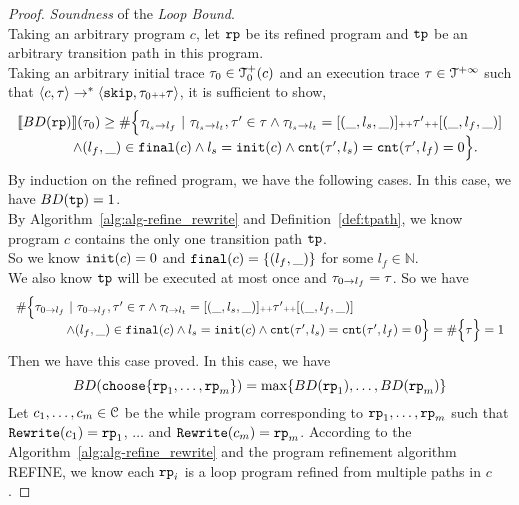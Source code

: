 \begin{proof}
\emph{Soundness} of the \emph{Loop Bound}.
  \\
  Taking an arbitrary program $c$, let $\mathtt{rp}$ be its refined program and $\mathtt{tp}$ be an arbitrary transition path in this program.
  \\
Taking an arbitrary initial trace $\mathtt{\tau}_0 \in \mathcal{T}^{+}_0(c)$  and an execution trace $\mathtt{\tau} \in \mathcal{T}^{+\infty}$
 such that $\langle {c}, \mathtt{\tau} \rangle \to^{*} \langle \mathtt{skip}, \mathtt{\tau}_0 {\scriptscriptstyle ++} \mathtt{\tau} \rangle$,
 it is sufficient to show,
 \[
  \begin{array}{l}
  \llbracket BD(\mathtt{rp}) \rrbracket(\mathtt{\tau}_0) \geq
  \# \Big\{\mathtt{\tau}_{l_s \to l_f} ~\vert~ \mathtt{\tau}_{l_s \to l_t}, \mathtt{\tau}' \in \mathtt{\tau} \land \mathtt{\tau}_{l_s \to l_t} = [(\_, l_s, \_)] {\scriptscriptstyle ++} \mathtt{\tau}' {\scriptscriptstyle ++} [(\_, l_f, \_)]
  \\ \qquad \qquad
  \land (l_{f}, \_) \in \mathtt{final}(c)
  \land l_s = \mathtt{init}(c)
  \land \mathtt{cnt}(\mathtt{\tau}', l_s) = \mathtt{cnt}(\mathtt{\tau}', l_f) = 0 
  \Big\}.
  \end{array}
\]
By induction on the refined program, we have the following cases.
\caseL{$\rprog = \tpath$}
In this case, we have $BD(\mathtt{tp}) = 1$.
\\
By Algorithm~\ref{alg:alg-refine_rewrite} and Definition~\ref{def:tpath}, we know program $c$ contains the only one transition path $\mathtt{tp}$.
\\
So we know $\mathtt{init}(c) = 0$ and $\mathtt{final}(c) = \{ (l_f, \_) \}$ for some $l_f \in \mathbb{N}$.
\\
We also know $\mathtt{tp}$ will be executed at most once and $\mathtt{\tau}_{0 \to l_f} = \mathtt{\tau}$. So we have
\[
  \begin{array}{l}
  \# \Big\{\mathtt{\tau}_{0 \to l_f} ~\vert~ \mathtt{\tau}_{0 \to l_f}, \mathtt{\tau}' \in \mathtt{\tau} \land \mathtt{\tau}_{l \to l_t} = [(\_, l_s, \_)] {\scriptscriptstyle ++} \mathtt{\tau}' {\scriptscriptstyle ++} [(\_, l_f, \_)]
  \\ \qquad \qquad
  \land (l_{f}, \_) \in \mathtt{final}(c)
  \land l_s = \mathtt{init}(c)
  \land \mathtt{cnt}(\mathtt{\tau}', l_s) = \mathtt{cnt}(\mathtt{\tau}', l_f) = 0 
  \Big\}
   = \# \Big\{\mathtt{\tau} \Big\} = 1
  \end{array}
\]
Then we have this case proved.
In this case, we have
\[
  BD(\rpchoose{\rprog_1, \ldots, \rprog_m }) = \max\left\{ BD(\rprog_1), \ldots, BD(\rprog_m) \right\}
\]
Let $c_1, \ldots, c_m \in \mathcal{C}$ be the while program corresponding to $\mathtt{rp}_1, \ldots, \mathtt{rp}_m$ such that $\mathtt{Rewrite}(c_1) = \mathtt{rp}_1$, $\ldots$ and  $\mathtt{Rewrite}(c_m) = \mathtt{rp}_m$.
According to the Algorithm~\ref{alg:alg-refine_rewrite} and the program refinement algorithm REFINE, we know each $\mathtt{rp}_i$ is a loop program refined from multiple paths in $c$.

\end{proof}
